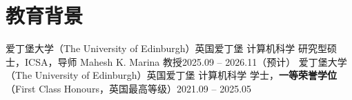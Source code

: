 \section{教育背景}
  \resumeSubHeadingListStart
    \resumeSubheading
      {爱丁堡大学（The University of Edinburgh）}{英国爱丁堡}
      {计算机科学 研究型硕士，ICSA，导师 Mahesh K. Marina 教授}{2025.09 -- 2026.11（预计）}
      \resumeItemListStart
      \resumeItemListEnd
    \resumeSubheading
      {爱丁堡大学（The University of Edinburgh）}{英国爱丁堡}
      {计算机科学 学士，\textbf{一等荣誉学位}（First Class Honours，英国最高等级）}{2021.09 -- 2025.05}
      \resumeItemListStart
      \resumeItemListEnd
  \resumeSubHeadingListEnd
